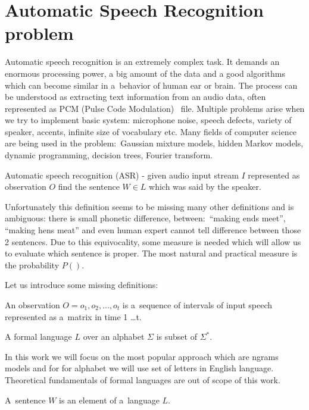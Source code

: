 \chapter{Automatic Speech Recognition problem}
Automatic speech recognition is an extremely complex task. It demands an enormous processing power, a big amount of the data and a good algorithms which can become similar in a~behavior of human ear or brain. The process can be understood as extracting text information from an audio data, often represented as PCM (Pulse Code Modulation) ~file. Multiple problems arise when we try to implement basic system: microphone noise, speech defects, variety of speaker, accents, infinite size of vocabulary etc. Many fields of computer science are being used in the problem:~Gaussian mixture models, hidden Markov models, dynamic programming, decision trees, Fourier transform. 

\begin{definition}
	Automatic speech recognition (ASR) - given audio input stream $I$ represented as observation $O$ find the sentence $W\in L$ which was said by the speaker. 
\end{definition}


Unfortunately this definition seems to be missing many other definitions and is ambiguous: there is small phonetic difference, between:~``making ends meet'', ``making hens meat'' and even human expert cannot tell difference between those 2 sentences. Due to this equivocality, some measure is needed which will allow us to evaluate which sentence is proper. The most natural and practical measure is the probability $P()$.


Let us introduce some missing definitions:

\begin{definition}
	An observation $O = o_1,o_2,\dots,o_t$ is a~sequence of intervals of input speech represented as a~matrix in time 1 \dots t.
\end{definition}

\begin{definition}
	A formal language $L$ over an alphabet $\Sigma$ is subset of $\Sigma^*$.
\end{definition}

In this work we will focus on the most popular approach which are n\dywiz grams models and for for alphabet we will use set of letters in English language. Theoretical fundamentals of formal languages are out of scope of this work.

\begin{definition}
	A~sentence $W$ is an element of a~language $L$.	
\end{definition}

